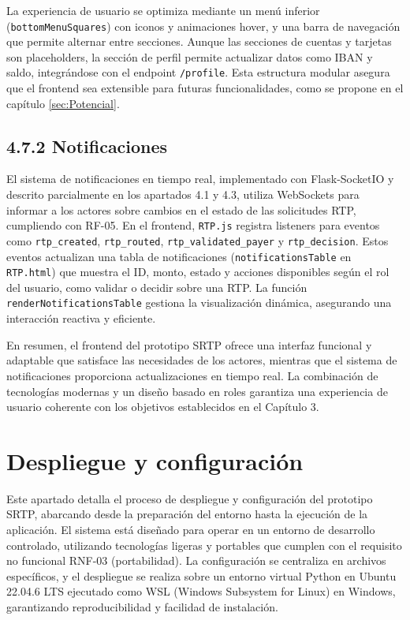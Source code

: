 La experiencia de usuario se optimiza mediante un menú inferior (\texttt{bottomMenuSquares}) con iconos y animaciones hover, y una barra de navegación que permite alternar entre secciones. Aunque las secciones de cuentas y tarjetas son placeholders, la sección de perfil permite actualizar datos como IBAN y saldo, integrándose con el endpoint \texttt{/profile}. Esta estructura modular asegura que el frontend sea extensible para futuras funcionalidades, como se propone en el capítulo \ref{sec:Potencial}.

\subsection*{4.7.2 \; Notificaciones}

El sistema de notificaciones en tiempo real, implementado con Flask-SocketIO y descrito parcialmente en los apartados 4.1 y 4.3, utiliza WebSockets para informar a los actores sobre cambios en el estado de las solicitudes RTP, cumpliendo con RF-05. En el frontend, \texttt{RTP.js} registra listeners para eventos como \texttt{rtp\_created}, \texttt{rtp\_routed}, \texttt{rtp\_validated\_payer} y \texttt{rtp\_decision}. Estos eventos actualizan una tabla de notificaciones (\texttt{notificationsTable} en \texttt{RTP.html}) que muestra el ID, monto, estado y acciones disponibles según el rol del usuario, como validar o decidir sobre una RTP. La función \texttt{renderNotificationsTable} gestiona la visualización dinámica, asegurando una interacción reactiva y eficiente.

En resumen, el frontend del prototipo SRTP ofrece una interfaz funcional y adaptable que satisface las necesidades de los actores, mientras que el sistema de notificaciones proporciona actualizaciones en tiempo real. La combinación de tecnologías modernas y un diseño basado en roles garantiza una experiencia de usuario coherente con los objetivos establecidos en el Capítulo 3.

\section{Despliegue y configuración}
\label{subsec:despliegue}

Este apartado detalla el proceso de despliegue y configuración del prototipo SRTP, abarcando desde la preparación del entorno hasta la ejecución de la aplicación. El sistema está diseñado para operar en un entorno de desarrollo controlado, utilizando tecnologías ligeras y portables que cumplen con el requisito no funcional RNF-03 (portabilidad). La configuración se centraliza en archivos específicos, y el despliegue se realiza sobre un entorno virtual Python en Ubuntu 22.04.6 LTS ejecutado como WSL (Windows Subsystem for Linux) en Windows, garantizando reproducibilidad y facilidad de instalación.

